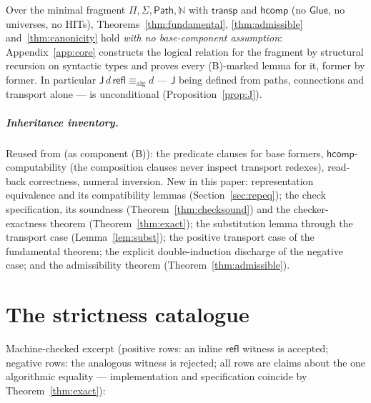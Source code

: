 \documentclass{lmcs}
\newcommand{\transp}{\mathsf{transp}}
\newcommand{\hcomp}{\mathsf{hcomp}}
\newcommand{\refl}{\mathsf{refl}}
\newcommand{\J}{\mathsf{J}}
\newcommand{\Glue}{\mathsf{Glue}}
\newcommand{\aconv}{\equiv_{\mathrm{alg}}}
\newcommand{\Path}{\mathsf{Path}}
\begin{document}
\begin{cor}\label{thm:core}
  Over the minimal fragment $\Pi, \Sigma, \Path, \mathbb{N}$ with
  $\transp$ and $\hcomp$ (no $\Glue$, no universes, no HITs),
  Theorems~\ref{thm:fundamental}, \ref{thm:admissible}
  and~\ref{thm:canonicity} hold \emph{with no base-component
  assumption}: Appendix~\ref{app:core} constructs the logical
  relation for the fragment by structural recursion on syntactic
  types and proves every (B)-marked lemma for it, former by former.
  In particular $\J\,d\,\refl \aconv d$ --- $\J$ being defined from
  paths, connections and transport alone --- is unconditional
  (Proposition~\ref{prop:J}).
\end{cor}

\subparagraph*{Inheritance inventory.}  Reused from
\cite{HuberNorm} (as component (B)): the predicate clauses for base
formers, $\hcomp$-computability (the composition clauses never
inspect transport redexes), read-back correctness, numeral
inversion.  New in this paper: representation equivalence and its
compatibility lemmas (Section~\ref{sec:repeq}); the check
specification, its soundness (Theorem~\ref{thm:checksound}) and the
checker-exactness theorem (Theorem~\ref{thm:exact}); the
substitution lemma through the transport case
(Lemma~\ref{lem:subst}); the positive transport case of the
fundamental theorem; the explicit double-induction discharge of the
negative case; and the admissibility theorem
(Theorem~\ref{thm:admissible}).

\section{The strictness catalogue}
\label{sec:catalogue}

Machine-checked excerpt (positive rows: an inline $\refl$ witness is
accepted; negative rows: the analogous witness is rejected; all rows
are claims about the one algorithmic equality --- implementation and
specification coincide by Theorem~\ref{thm:exact}):
\end{document}

